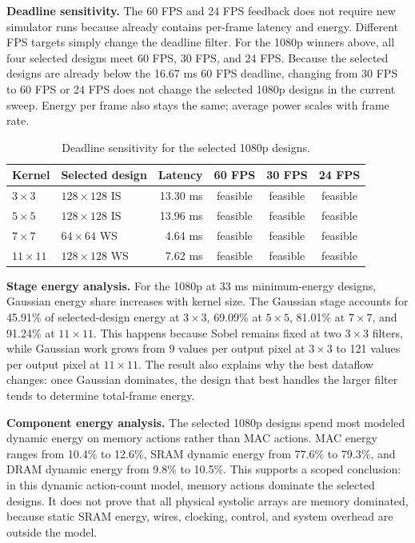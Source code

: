 \documentclass[12pt]{article}
\begin{document}
\textbf{Deadline sensitivity.} The 60 FPS and 24 FPS feedback does not require new simulator runs because  already contains per-frame latency and energy. Different FPS targets simply change the deadline filter. For the 1080p winners above, all four selected designs meet 60 FPS, 30 FPS, and 24 FPS. Because the selected designs are already below the 16.67 ms 60 FPS deadline, changing from 30 FPS to 60 FPS or 24 FPS does not change the selected 1080p designs in the current sweep. Energy per frame also stays the same; average power scales with frame rate.

\begin{table}[H]
\centering
\small
\caption{Deadline sensitivity for the selected 1080p designs.}
\begin{tabular}{l l r c c c}
\toprule
Kernel & Selected design & Latency & 60 FPS & 30 FPS & 24 FPS \\
\midrule
$3\times3$ & $128\times128$ IS & 13.30 ms & feasible & feasible & feasible \\
$5\times5$ & $128\times128$ IS & 13.96 ms & feasible & feasible & feasible \\
$7\times7$ & $64\times64$ WS & 4.64 ms & feasible & feasible & feasible \\
$11\times11$ & $128\times128$ WS & 7.62 ms & feasible & feasible & feasible \\
\bottomrule
\end{tabular}
\end{table}

\textbf{Stage energy analysis.} For the 1080p at 33 ms minimum-energy designs, Gaussian energy share increases with kernel size. The Gaussian stage accounts for 45.91\% of selected-design energy at $3\times3$, 69.09\% at $5\times5$, 81.01\% at $7\times7$, and 91.24\% at $11\times11$. This happens because Sobel remains fixed at two $3\times3$ filters, while Gaussian work grows from 9 values per output pixel at $3\times3$ to 121 values per output pixel at $11\times11$. The result also explains why the best dataflow changes: once Gaussian dominates, the design that best handles the larger filter tends to determine total-frame energy.

\textbf{Component energy analysis.} The selected 1080p designs spend most modeled dynamic energy on memory actions rather than MAC actions. MAC energy ranges from 10.4\% to 12.6\%, SRAM dynamic energy from 77.6\% to 79.3\%, and DRAM dynamic energy from 9.8\% to 10.5\%. This supports a scoped conclusion: in this dynamic action-count model, memory actions dominate the selected designs. It does not prove that all physical systolic arrays are memory dominated, because static SRAM energy, wires, clocking, control, and system overhead are outside the model.
\end{document}
